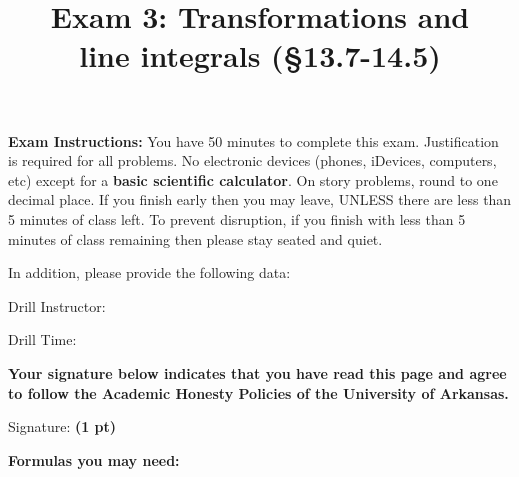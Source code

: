 \documentclass[12pt, addpoints]{exam/exam}
\title{\vspace{-8pc}
\vfill{\Huge
	\bf Exam 3: Transformations and \\ line integrals (\S 13.7-14.5)} 
	}
\date{}
\theoremstyle{plain}
\begin{document}
\begin{coverpages}
\maketitle
\thispagestyle{headandfoot}
\vspace{-4pc}
{\bf Exam Instructions:} You have 50 minutes to complete this exam.  Justification is required for all problems.  %
No electronic devices (phones, iDevices, computers, etc) except for a \textbf{basic scientific calculator}.  On story problems, round to one decimal place. If you finish early then you may leave, UNLESS there are less than 5 minutes of class left.  To prevent disruption, if you finish with less than 5 minutes of class remaining then please stay seated and quiet.

\begin{flushright}
In addition, please provide the following data:

\vspace{0.3in}
Drill Instructor: \underline{\hspace{40ex}}

\vspace{0.3in}
Drill Time: \underline{\hspace{40ex}}
\end{flushright}

\vfill
\textbf{Your signature below indicates that you have read this page and agree to follow the Academic Honesty Policies of the University of Arkansas.}  

\vspace{0.3in}
Signature: {\bf (1 pt)} \underline{\hspace{73ex}}

\newpage
\textbf{Formulas you may need:}
\vspace{-2pc}


\end{coverpages}
\end{document}
